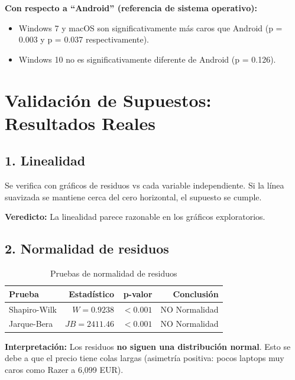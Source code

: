 \documentclass[12pt,a4paper]{article}
\begin{document}
\textbf{Con respecto a ``Android'' (referencia de sistema operativo):}
\begin{itemize}
    \item Windows 7 y macOS son significativamente más caros que Android (p = 0.003 y p = 0.037 respectivamente).
    \item Windows 10 no es significativamente diferente de Android (p = 0.126).
\end{itemize}

\section{Validación de Supuestos: Resultados Reales}

\subsection{1. Linealidad}

Se verifica con gráficos de residuos vs cada variable independiente. Si la línea suavizada se mantiene cerca del cero horizontal, el supuesto se cumple.

\textbf{Veredicto:} La linealidad parece razonable en los gráficos exploratorios.

\subsection{2. Normalidad de residuos}

\begin{table}[H]
\centering
\caption{Pruebas de normalidad de residuos}
\begin{tabular}{lrrr}
\toprule
\textbf{Prueba} & \textbf{Estadístico} & \textbf{p-valor} & \textbf{Conclusión} \\
\midrule
Shapiro-Wilk & $W = 0.9238$ & $<0.001$ & \textcolor{rojoacento}{NO Normalidad} \\
Jarque-Bera & $JB = 2411.46$ & $<0.001$ & \textcolor{rojoacento}{NO Normalidad} \\
\bottomrule
\end{tabular}
\end{table}

\textbf{Interpretación:} Los residuos \textbf{no siguen una distribución normal}. Esto se debe a que el precio tiene colas largas (asimetría positiva: pocos laptops muy caros como Razer a 6,099 EUR).
\end{document}
